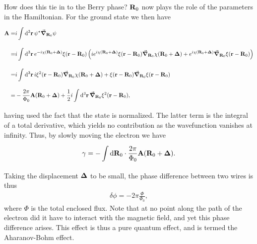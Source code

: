 How does this tie in to the Berry phase? $\vb{R}_{0}$ now plays the role of the parameters in the Hamiltonian. For the ground state we then have
\begin{align*}
	\vb{A} =& i\int\limits_{}^{}\dd[3]{\vb{r}}\psi^{\star}\grad_{\vb{R}_{0}}\psi \\
	       =& i\int\limits_{}^{}\dd[3]{\vb{r}}e^{-i\chi(\vb{R}_{0} + \vb*{\Delta})}\xi(\vb{r} - \vb{R}_{0})\left(ie^{i\chi(\vb{R}_{0} + \vb*{\Delta})}\xi(\vb{r} - \vb{R}_{0})\grad_{\vb{R}_{0}}\chi(\vb{R}_{0} + \vb*{\Delta}) + e^{i\chi(\vb{R}_{0} + \vb*{\Delta})}\grad_{\vb{R}_{0}}\xi(\vb{r} - \vb{R}_{0})\right) \\
	       =& i\int\limits_{}^{}\dd[3]{\vb{r}}i\xi^{2}(\vb{r} - \vb{R}_{0})\grad_{\vb{R}_{0}}\chi(\vb{R}_{0} + \vb*{\Delta}) + \xi(\vb{r} - \vb{R}_{0})\grad_{\vb{R}_{0}}\xi(\vb{r} - \vb{R}_{0}) \\
	       =& -\frac{2\pi}{\Phi_{0}}\vb{A}(\vb{R}_{0} + \vb*{\Delta}) + \frac{1}{2}i\int\limits_{}^{}\dd[3]{\vb{r}}\grad_{\vb{R}_{0}}\xi^{2}(\vb{r} - \vb{R}_{0}),
\end{align*}
having used the fact that the state is normalized. The latter term is the integral of a total derivative, which yields no contribution as the wavefunction vanishes at infinity. Thus, by slowly moving the electron we have
\begin{align*}
	\gamma = -\int\limits_{}^{}\dd{\vb{R}_{0}}\cdot\frac{2\pi}{\Phi_{0}}\vb{A}(\vb{R}_{0} + \vb*{\Delta}).
\end{align*}
Taking the displacement $\vb*{\Delta}$ to be small, the phase difference between two wires is thus
\begin{align*}
	\delta\phi = -2\pi\frac{\Phi}{\Phi_{0}},
\end{align*}
where $\Phi$ is the total enclosed flux. Note that at no point along the path of the electron did it have to interact with the magnetic field, and yet this phase difference arises. This effect is thus a pure quantum effect, and is termed the Aharanov-Bohm effect.

